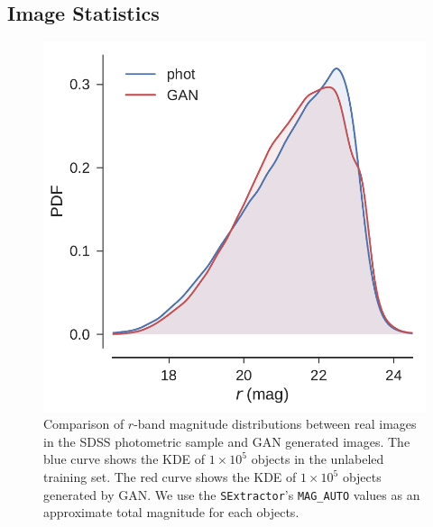 \documentclass[fleqn,usenatbib]{mnras}
\begin{document}
\subsection{Image Statistics}
  \label{sec:image_stats}


\begin{figure}
  \centering
  \includegraphics[width=\columnwidth]{figures/mag_kde.pdf}
  \caption{
      Comparison of $r$-band magnitude distributions between real images in the SDSS photometric sample
      and GAN generated images.
      The blue curve shows the KDE of $1 \times 10^5$ objects in the unlabeled training set.
      The red curve shows the KDE of $1 \times 10^5$ objects generated by GAN.
      We use the \texttt{SExtractor}'s \texttt{MAG\_AUTO} values as an approximate total magnitude for each objects.
      }
  \label{fig:mag_kde}
\end{figure}
\end{document}
